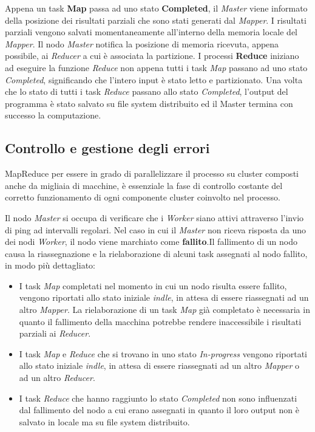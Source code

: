 \documentclass[LaM,binding=0.6cm]{sapthesis}
\begin{document}
Appena un task \textbf{Map} passa ad uno stato \textbf{Completed}, il \textit{Master} viene informato della posizione dei risultati parziali che sono stati generati dal \textit{Mapper}. I risultati parziali vengono salvati momentaneamente all'interno della memoria locale del \textit{Mapper}. Il nodo \textit{Master} notifica la posizione di memoria ricevuta, appena possibile, ai \textit{Reducer} a cui è associata la partizione. 
I processi \textbf{Reduce} iniziano ad eseguire la funzione \textit{Reduce} non appena tutti i task \textit{Map} passano ad uno stato \textit{Completed}, significando che  l'intero input è stato letto e partizionato.
Una volta che lo stato di tutti i task \textit{Reduce} passano allo stato \textit{Completed}, l'output del programma è stato salvato su file system distribuito ed il Master termina con successo la computazione.

\subsection{Controllo e gestione degli errori}

MapReduce \cite{Dean:2008:MSD:1327452.1327492} per essere in grado di parallelizzare il processo su cluster composti anche da migliaia di macchine, è essenziale la fase di controllo costante del corretto funzionamento di ogni componente cluster coinvolto nel processo.

Il nodo \textit{Master} si occupa di verificare che i \textit{Worker} siano attivi attraverso l'invio di ping ad intervalli regolari.
Nel caso in cui il \textit{Master} non riceva risposta da uno dei nodi \textit{Worker}, il nodo viene marchiato come \textbf{fallito}.Il fallimento di un nodo causa la riassegnazione e la rielaborazione di alcuni task assegnati al nodo fallito, in modo più dettagliato:
\begin{itemize}
\item{I task \textit{Map} completati nel momento in cui un nodo risulta essere fallito, vengono riportati allo stato iniziale \textit{indle}, in attesa di essere riassegnati ad un altro \textit{Mapper}. La rielaborazione di un task \textit{Map} già completato è necessaria in quanto il fallimento della macchina potrebbe rendere inaccessibile i risultati parziali ai \textit{Reducer}.
}
\item{I task \textit{Map} e \textit{Reduce} che si trovano in uno stato \textit{In-progress} vengono riportati allo stato iniziale \textit{indle}, in attesa di essere riassegnati ad un altro \textit{Mapper} o ad un altro \textit{Reducer}.}
\item{I task \textit{Reduce} che hanno raggiunto lo stato \textit{Completed} non sono influenzati dal fallimento del nodo a cui erano assegnati in quanto il loro output non è salvato in locale ma su file system distribuito.}
\end{itemize}
\end{document}
